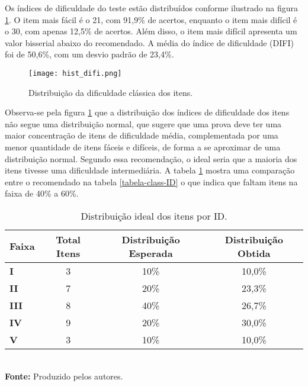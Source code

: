 Os índices de dificuldade do teste estão distribuídos conforme ilustrado na figura \ref{fig:hist_difi}. O item mais fácil é o 21, com 91,9\% de acertos, enquanto o item mais difícil é o 30, com apenas 12,5\% de acertos. Além disso, o item mais difícil apresenta um valor bisserial abaixo do recomendado. A média do índice de dificuldade (DIFI) foi de 50,6\%, com um desvio padrão de 23,4\%.

\begin{figure}[H]
	\centering
	\caption{Distribuição da dificuldade clássica dos itens.}
	\texttt{[image: hist\_difi.png]}
	\parbox{\textwidth}{
		\centering %
	}
	\label{fig:hist_difi}
\end{figure}


Observa-se pela figura \ref{fig:hist_difi} que a distribuição dos índices de dificuldade dos itens não segue uma distribuição normal, que sugere que uma prova deve ter uma maior concentração de itens de dificuldade média, complementada por uma menor quantidade de itens fáceis e difíceis, de forma a se aproximar de uma distribuição normal. Segundo essa recomendação, o ideal seria que a maioria dos itens tivesse uma dificuldade intermediária. A tabela \ref{tabela-dificuldade-obtida} mostra uma comparação entre o recomendado na tabela \ref{tabela-class-ID} o que indica que faltam itens na faixa de 40\% a 60\%.

\begin{table}[H]
	\centering
		\caption{Distribuição ideal dos itens por ID.}
		\label{tabela-dificuldade-obtida}
		\begin{tabular}{lccc}
			\toprule
				\textbf{Faixa} & \textbf{Total Itens} &\textbf{ Distribuição Esperada} & \textbf{Distribuição Obtida}   \\ 
			\hline
			 \textbf{I} & 3 & 10\% &  10,0\% \\ 
			\hline
			\textbf{II} & 7 & 20\% & 23,3\% \\
			\hline
			\textbf{III} & 8 & 40\% & 26,7\% \\ 
			\hline
			 \textbf{IV}& 9 & 20\% & 30,0\% \\ 
			\hline
			 \textbf{V} & 3 & 10\% & 10,0\% \\ 
			\bottomrule
		\end{tabular}\\
		\vspace*{0.5cm}
		\small{\textbf{Fonte:} Produzido pelos autores.}
\end{table}



